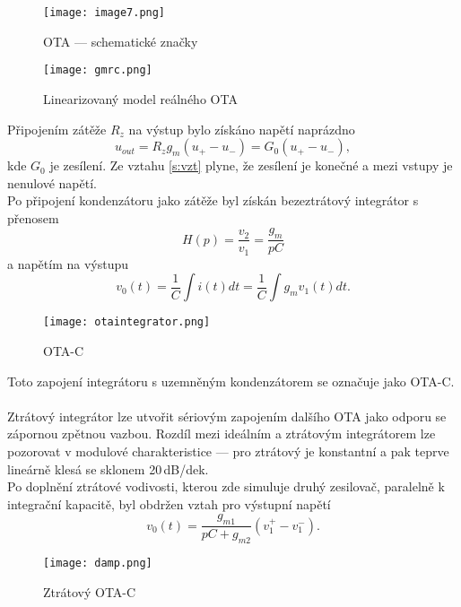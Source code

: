 \begin{figure}[h]
\centering
\texttt{[image: image7.png]}
\caption[OTA --- schematické značky]{OTA --- schematické značky \cite{14}}
\end{figure}
\begin{figure}[h]
\centering
\texttt{[image: gmrc.png]}
\caption[Linearizovaný model reálného OTA]{Linearizovaný model reálného OTA \cite{9}}
\end{figure}
\noindent Připojením zátěže $R_z$ na výstup bylo získáno napětí naprázdno
\begin{equation}\label{s:vzt}
u_{out} = R_zg_m(u_+ - u_-) = G_0(u_+ - u_-),
\end{equation}
kde $G_0$ je zesílení. Ze vztahu \ref{s:vzt} plyne, že zesílení je konečné a mezi vstupy je nenulové napětí. \\
\noindent Po připojení kondenzátoru jako zátěže byl získán bezeztrátový integrátor s přenosem
\begin{equation}
H(p) = \frac{v_2}{v_1} = \frac{g_m}{pC}
\end{equation}
\noindent a napětím na výstupu
\begin{equation}
v_0(t) = \frac{1}{C}\int i(t)dt = \frac{1}{C}\int g_mv_1(t)dt.
\end{equation}
\begin{figure}[h]
\centering
\texttt{[image: otaintegrator.png]}
\caption[OTA-C]{OTA-C \cite{9} \label{s:GM-C}}
\end{figure}
\noindent Toto zapojení integrátoru s uzemněným kondenzátorem se označuje jako OTA-C.\\
\\
Ztrátový integrátor lze utvořit sériovým zapojením dalšího OTA jako odporu se zápornou zpětnou vazbou. Rozdíl mezi ideálním a ztrátovým integrátorem lze pozorovat v modulové charakteristice --- pro ztrátový je konstantní a pak teprve lineárně klesá se sklonem 20\,dB/dek.\\
Po doplnění ztrátové vodivosti, kterou zde simuluje druhý zesilovač, paralelně k integrační kapacitě, byl obdržen vztah pro výstupní napětí
\begin{equation}
v_0(t) = \frac{g_{m1}}{pC + g_{m2}}(v_1^+ - v_{1}^-).\label{s:OTA-INT1}
\end{equation}
\begin{figure}[h]
\centering
\texttt{[image: damp.png]}
\caption[Ztrátový OTA-C]{Ztrátový OTA-C \cite{9} \label{s:OTA-INT}}
\end{figure}

